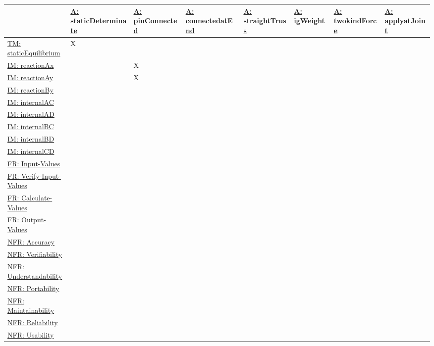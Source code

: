 \documentclass[12pt]{article}
\begin{document}
\begin{longtable}{l l l l l l l l}
\toprule
\textbf{} & \textbf{\hyperref[staticDeterminate]{A: staticDeterminate}} & \textbf{\hyperref[pinConnected]{A: pinConnected}} & \textbf{\hyperref[connectedatEnd]{A: connectedatEnd}} & \textbf{\hyperref[straightTruss]{A: straightTruss}} & \textbf{\hyperref[igWeight]{A: igWeight}} & \textbf{\hyperref[twokindForce]{A: twokindForce}} & \textbf{\hyperref[applyatJoint]{A: applyatJoint}}
\\
\midrule
\endhead
\hyperref[TM:staticEquilibrium]{TM: staticEquilibrium} & X &  &  &  &  &  & 
\\
\hyperref[IM:reactionAx]{IM: reactionAx} &  & X &  &  &  &  & 
\\
\hyperref[IM:reactionAy]{IM: reactionAy} &  & X &  &  &  &  & 
\\
\hyperref[IM:reactionBy]{IM: reactionBy} &  &  &  &  &  &  & 
\\
\hyperref[IM:internalAC]{IM: internalAC} &  &  &  &  &  &  & 
\\
\hyperref[IM:internalAD]{IM: internalAD} &  &  &  &  &  &  & 
\\
\hyperref[IM:internalBC]{IM: internalBC} &  &  &  &  &  &  & 
\\
\hyperref[IM:internalBD]{IM: internalBD} &  &  &  &  &  &  & 
\\
\hyperref[IM:internalCD]{IM: internalCD} &  &  &  &  &  &  & 
\\
\hyperref[inputValues]{FR: Input-Values} &  &  &  &  &  &  & 
\\
\hyperref[verifyInVals]{FR: Verify-Input-Values} &  &  &  &  &  &  & 
\\
\hyperref[calcValues]{FR: Calculate-Values} &  &  &  &  &  &  & 
\\
\hyperref[outputValues]{FR: Output-Values} &  &  &  &  &  &  & 
\\
\hyperref[accurate]{NFR: Accuracy} &  &  &  &  &  &  & 
\\
\hyperref[verifiable]{NFR: Verifiability} &  &  &  &  &  &  & 
\\
\hyperref[understandable]{NFR: Understandability} &  &  &  &  &  &  & 
\\
\hyperref[portable]{NFR: Portability} &  &  &  &  &  &  & 
\\
\hyperref[maintainable]{NFR: Maintainability} &  &  &  &  &  &  & 
\\
\hyperref[reliable]{NFR: Reliability} &  &  &  &  &  &  & 
\\
\hyperref[usable]{NFR: Usability} &  &  &  &  &  &  & 

\end{longtable}
\end{document}
